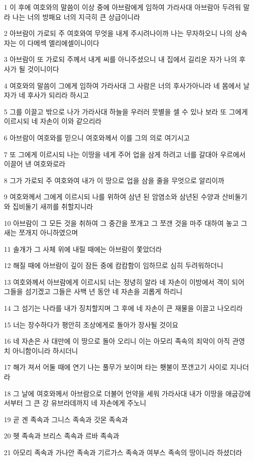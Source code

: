\par 1 이 후에 여호와의 말씀이 이상 중에 아브람에게 임하여 가라사대 아브람아 두려워 말라 나는 너의 방패요 너의 지극히 큰 상급이니라
\par 2 아브람이 가로되 주 여호와여 무엇을 내게 주시려나이까 나는 무자하오니 나의 상속자는 이 다메섹 엘리에셀이니이다
\par 3 아브람이 또 가로되 주께서 내게 씨를 아니주셨으니 내 집에서 길리운 자가 나의 후사가 될 것이니이다
\par 4 여호와의 말씀이 그에게 임하여 가라사대 그 사람은 너의 후사가아니라 네 몸에서 날 자가 네 후사가 되리라 하시고
\par 5 그를 이끌고 밖으로 나가 가라사대 하늘을 우러러 뭇별을 셀 수 있나 보라 또 그에게 이르시되 네 자손이 이와 같으리라
\par 6 아브람이 여호와를 믿으니 여호와께서 이를 그의 의로 여기시고
\par 7 또 그에게 이르시되 나는 이땅을 네게 주어 업을 삼게 하려고 너를 갈대아 우르에서 이끌어 낸 여호와로라
\par 8 그가 가로되 주 여호와여 내가 이 땅으로 업을 삼을 줄을 무엇으로 알리이까
\par 9 여호와께서 그에게 이르시되 나를 위하여 삼년 된 암염소와 삼년된 수양과 산비둘기와 집비둘기 새끼를 취할지니라
\par 10 아브람이 그 모든 것을 취하여 그 중간을 쪼개고 그 쪼갠 것을 마주 대하여 놓고 그 새는 쪼개지 아니하였으며
\par 11 솔개가 그 사체 위에 내릴 때에는 아브람이 쫓았더라
\par 12 해질 때에 아브람이 깊이 잠든 중에 캄캄함이 임하므로 심히 두려워하더니
\par 13 여호와께서 아브람에게 이르시되 너는 정녕히 알라 네 자손이 이방에서 객이 되어 그들을 섬기겠고 그들은 사백 년 동안 네 자손을 괴롭게 하리니
\par 14 그 섬기는 나라를 내가 징치할지며 그 후에 네 자손이 큰 재물을 이끌고 나오리라
\par 15 너는 장수하다가 평안히 조상에게로 돌아가 장사될 것이요
\par 16 네 자손은 사 대만에 이 땅으로 돌아 오리니 이는 아모리 족속의 죄악이 아직 관영치 아니함이니라 하시더니
\par 17 해가 져서 어둘 때에 연기 나는 풀무가 보이며 타는 횃불이 쪼갠고기 사이로 지나더라
\par 18 그 날에 여호와께서 아브람으로 더불어 언약을 세워 가라사대 내가 이땅을 애굽강에서부터 그 큰 강 유브라데까지 네 자손에게 주노니
\par 19 곧 겐 족속과 그니스 족속과 갓몬 족속과
\par 20 헷 족속과 브리스 족속과 르바 족속과
\par 21 아모리 족속과 가나안 족속과 기르가스 족속과 여부스 족속의 땅이니라 하셨더라


